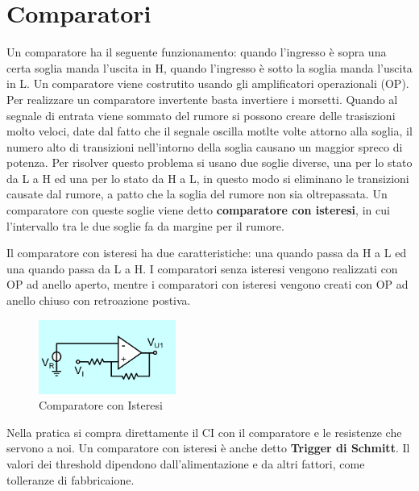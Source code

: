 \documentclass[12pt]{article}
\begin{document}
\section{Comparatori}
Un comparatore ha il seguente funzionamento: quando l'ingresso \`e sopra una certa soglia manda l'uscita in H, quando l'ingresso \`e sotto la soglia manda l'uscita in L. Un comparatore viene costrutito usando gli amplificatori operazionali (OP). Per realizzare un comparatore invertente basta invertiere i morsetti. Quando al segnale di entrata viene sommato del rumore si possono creare delle trasiszioni molto veloci, date dal fatto che il segnale oscilla motlte volte attorno alla soglia, il numero alto di transizioni nell'intorno della soglia causano un maggior spreco di potenza. Per risolver questo problema si usano due soglie diverse, una per lo stato da L a H ed una per lo stato da H a L, in questo modo si eliminano le transizioni causate dal rumore, a patto che la soglia del rumore non sia oltrepassata. Un comparatore con queste soglie viene detto \textbf{comparatore con isteresi}, in cui l'intervallo tra le due soglie fa da margine per il rumore.

Il comparatore con isteresi ha due caratteristiche: una quando passa da H a L ed una quando passa da L a H. I comparatori senza isteresi vengono realizzati con OP ad anello aperto, mentre i comparatori con isteresi vengono creati con OP ad anello chiuso con retroazione postiva. 
\begin{figure}[H]
    \centering
    \includegraphics[width=0.4\textwidth]{comparatore-con-insteresi.png}
    \caption{Comparatore con Isteresi}
    \label{fig:comparatore-con-insteresi}
\end{figure}

Nella pratica si compra direttamente il CI con il comparatore e le resistenze che servono a noi. Un comparatore con isteresi \`e anche detto \textbf{Trigger di Schmitt}. Il valori dei threshold dipendono dall'alimentazione e da altri fattori, come tolleranze di fabbricaione.
\end{document}
